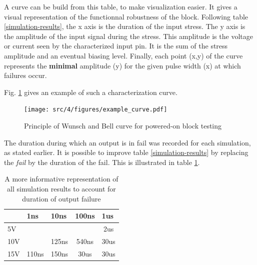 A curve can be build from this table, to make visualization easier.
It gives a visual representation of the functionnal robustness of the block.
Following table \ref{simulation-results}, the x axis is the duration of the input stress.
The y axis is the amplitude of the input signal during the stress.
This amplitude is the voltage or current seen by the characterized input pin. It is the sum of the stress amplitude and an eventual biasing level.
Finally, each point (x,y) of the curve represents the \textbf{minimal} amplitude (y) for the given pulse width (x) at which failures occur.

Fig. \ref{wb_cz_curve_example} gives an example of such a characterization curve.

\begin{figure}[!htbp]
  \centering
  \texttt{[image: src/4/figures/example\_curve.pdf]}
  \caption{Principle of Wunsch and Bell curve for powered-on block testing}
  \label{wb_cz_curve_example}
\end{figure}

The duration during which an output is in fail was recorded for each simulation, as stated earlier.
It is possible to improve table \ref{simulation-results} by replacing the \textit{fail} by the duration of the fail.
This is illustrated in table \ref{simulation-results-bis}.

\begin{table}[!htbp]
\centering
\begin{tabular}{@{}lcccc@{}}
\toprule
    & \multicolumn{1}{l}{1ns}      & \multicolumn{1}{l}{10ns}     & \multicolumn{1}{l}{100ns}    & \multicolumn{1}{l}{1us}     \\ \midrule
5V  & {\color[HTML]{32CB00} }      & {\color[HTML]{32CB00} }      & {\color[HTML]{32CB00} }      & {\color[HTML]{F56B00} 2us}  \\
10V & {\color[HTML]{32CB00} }      & {\color[HTML]{00D2CB} 125ns} & {\color[HTML]{F8A102} 540ns} & {\color[HTML]{FE0000} 30us} \\
15V & {\color[HTML]{00D2CB} 110ns} & {\color[HTML]{FFCB2F} 150ns} & {\color[HTML]{FE0000} 30us}  & {\color[HTML]{FE0000} 30us} \\ \bottomrule
\end{tabular}
\caption{A more informative representation of all simulation results to account for duration of output failure}
\label{simulation-results-bis}
\end{table}

